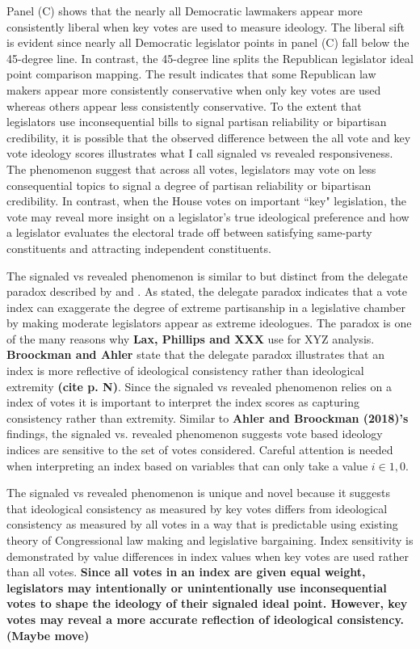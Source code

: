 \documentclass[10pt,letterpaper]{article}
\begin{document}
Panel (C) shows that the nearly all Democratic lawmakers appear more consistently liberal when key votes are used to measure ideology. The liberal sift is evident since nearly all Democratic legislator points in panel (C) fall below the 45-degree line. In contrast, the 45-degree line splits the Republican legislator ideal point comparison mapping. The result indicates that some Republican law makers appear more consistently conservative when only key votes are used whereas others appear less consistently conservative. To the extent that legislators use inconsequential bills to signal partisan reliability or bipartisan credibility, it is possible that the observed difference between the all vote and key vote ideology scores illustrates what I call signaled vs revealed responsiveness. The phenomenon suggest that across all votes, legislators may vote on less consequential topics to signal a degree of partisan reliability or bipartisan credibility. In contrast, when the House votes on important ``key" legislation, the vote may reveal more insight on a legislator's true ideological preference and how a legislator evaluates the electoral trade off between satisfying same-party constituents and attracting independent constituents.

 

The signaled vs revealed phenomenon is similar to but distinct from the delegate paradox described by \cite{Broockman2016} and \cite{Ahler2018}. As stated, the delegate paradox indicates that a vote index can exaggerate the degree of extreme partisanship in a legislative chamber by making moderate legislators appear as extreme ideologues. The paradox is one of the many reasons why \textbf{Lax, Phillips and XXX} use for XYZ analysis. \textbf{Broockman and Ahler} state that the delegate paradox illustrates that an index is more reflective of ideological consistency rather than ideological extremity \textbf{(cite p. N)}. Since the signaled vs revealed phenomenon relies on a index of votes it is important to interpret the index scores as capturing consistency rather than extremity. Similar to \textbf{Ahler and Broockman (2018)'s} findings, the signaled vs. revealed phenomenon suggests vote based ideology indices are sensitive to the set of votes considered. Careful attention is needed when interpreting an index based on variables that can only take a value $i \in {1,0}$.

The signaled vs revealed phenomenon is unique and novel because it suggests that ideological consistency as measured by key votes differs from ideological consistency as measured by all votes in a way that is predictable using existing theory of Congressional law making and legislative bargaining. Index sensitivity is demonstrated by value differences in index values when key votes are used rather than all votes. \textbf{Since all votes in an index are given equal weight, legislators may intentionally or unintentionally use inconsequential votes to shape the ideology of their signaled ideal point. However, key votes may reveal a more accurate reflection of ideological consistency. (Maybe move)}
\end{document}
